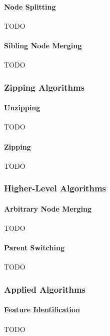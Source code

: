 \paragraph{Node Splitting}

TODO

\paragraph{Sibling Node Merging}

TODO

\subsubsection{Zipping Algorithms}

\paragraph{Unzipping}

TODO

\paragraph{Zipping}

TODO

\subsubsection{Higher-Level Algorithms}

\paragraph{Arbitrary Node Merging}

TODO

\paragraph{Parent Switching}

TODO

\subsubsection{Applied Algorithms}

\paragraph{Feature Identification}

TODO

